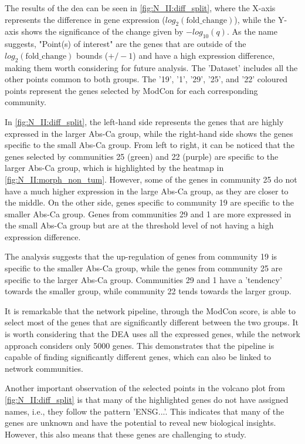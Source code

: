 The results of the \acrshort{dea} can be seen in \cref{fig:N_II:diff_split}, where the X-axis represents the difference in gene expression ($log_2(\text{fold\_change})$), while the Y-axis shows the significance of the change given by $-log_{10}(q)$. As the name suggests, "Point(s) of interest" are the genes that are outside of the $log_2(\text{fold\_change})$ bounds (\textbf{$+/-1$}) and have a high expression difference, making them worth considering for future analysis. The 'Dataset' includes all the other points common to both groups. The '19', '1', '29', '25', and '22' coloured points represent the genes selected by ModCon for each corresponding community.

In \cref{fig:N_II:diff_split}, the left-hand side represents the genes that are highly expressed in the larger Abs-Ca group, while the right-hand side shows the genes specific to the small Abs-Ca group. From left to right, it can be noticed that the genes selected by communities 25 (green) and 22 (purple) are specific to the larger Abs-Ca group, which is highlighted by the heatmap in \cref{fig:N_II:morph_non_tum}. However, some of the genes in community 25 do not have a much higher expression in the large Abs-Ca group, as they are closer to the middle. On the other side, genes specific to community 19 are specific to the smaller Abs-Ca group. Genes from communities 29 and 1 are more expressed in the small Abs-Ca group but are at the threshold level of not having a high expression difference.


The analysis suggests that the up-regulation of genes from community 19 is specific to the smaller Abs-Ca group, while the genes from community 25 are specific to the larger Abs-Ca group. Communities 29 and 1 have a 'tendency' towards the smaller group, while community 22 tends towards the larger group.

It is remarkable that the network pipeline, through the ModCon score, is able to select most of the genes that are significantly different between the two groups. It is worth considering that the DEA uses all the expressed genes, while the network approach considers only 5000 genes. This demonstrates that the pipeline is capable of finding significantly different genes, which can also be linked to network communities.

Another important observation of the selected points in the volcano plot from \cref{fig:N_II:diff_split} is that many of the highlighted genes do not have assigned names, i.e., they follow the pattern 'ENSG...'. This indicates that many of the genes are unknown and have the potential to reveal new biological insights. However, this also means that these genes are challenging to study.


